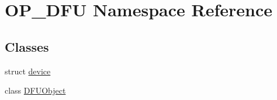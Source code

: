 \hypertarget{namespace_o_p___d_f_u}{\section{\-O\-P\-\_\-\-D\-F\-U \-Namespace \-Reference}
\label{namespace_o_p___d_f_u}
}
\subsection*{\-Classes}
\begin{DoxyCompactItemize}
\item 
struct \hyperlink{struct_o_p___d_f_u_1_1device}{device}
\item 
class \hyperlink{class_o_p___d_f_u_1_1_d_f_u_object}{\-D\-F\-U\-Object}
\end{DoxyCompactItemize}
